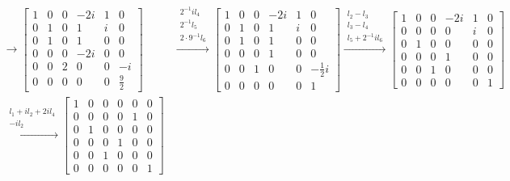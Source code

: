 \begin{align*}
{	}{\longrightarrow}
	\begin{bmatrix*}
		1 & 0  & 0 & -2i  & 1  & 0\\
		0 & 1 & 0 & 1  & i & 0\\
		0 & 1  & 0 & 1  & 0  & 0\\
		0 & 0  & 0 & -2i & 0  & 0\\
		0 & 0  & 2 & 0  & 0  & -i\\
		0 & 0  & 0 & 0  & 0  & \frac{9}{2}
	\end{bmatrix*}&
	\overset{
		\begin{matrix}
			2^{-1}il_4\\
			2^{-1}l_5\\
			2 \cdot 9^{-1}l_6
		\end{matrix}
	}{\longrightarrow}
	\begin{bmatrix*}
		1 & 0 & 0 & -2i & 1 & 0\\
		0 & 1 & 0 & 1   & i & 0\\
		0 & 1 & 0 & 1   & 0 & 0\\
		0 & 0 & 0 & 1   & 0 & 0\\
		0 & 0 & 1 & 0   & 0 & -\frac{1}{2}i\\
		0 & 0 & 0 & 0   & 0 & 1
	\end{bmatrix*}
	\overset{
		\begin{matrix}
			l_2 - l_3\\
			l_3 - l_4\\
			l_5 + 2^{-1}il_6
		\end{matrix}
	}{\longrightarrow}
	\begin{bmatrix*}
		1 & 0 & 0 & -2i & 1 & 0\\
		0 & 0 & 0 & 0   & i & 0\\
		0 & 1 & 0 & 0   & 0 & 0\\
		0 & 0 & 0 & 1   & 0 & 0\\
		0 & 0 & 1 & 0   & 0 & 0\\
		0 & 0 & 0 & 0   & 0 & 1
	\end{bmatrix*}\\
	\overset{
		\begin{matrix}
			l_1 + il_2 + 2il_4\\
			-il_2
		\end{matrix}
	}{\longrightarrow}
	\begin{bmatrix*}
		1 & 0 & 0 & 0 & 0 & 0\\
		0 & 0 & 0 & 0   & 1 & 0\\
		0 & 1 & 0 & 0   & 0 & 0\\
		0 & 0 & 0 & 1   & 0 & 0\\
		0 & 0 & 1 & 0   & 0 & 0\\
		0 & 0 & 0 & 0   & 0 & 1
	\end{bmatrix*}&
\end{align*}
